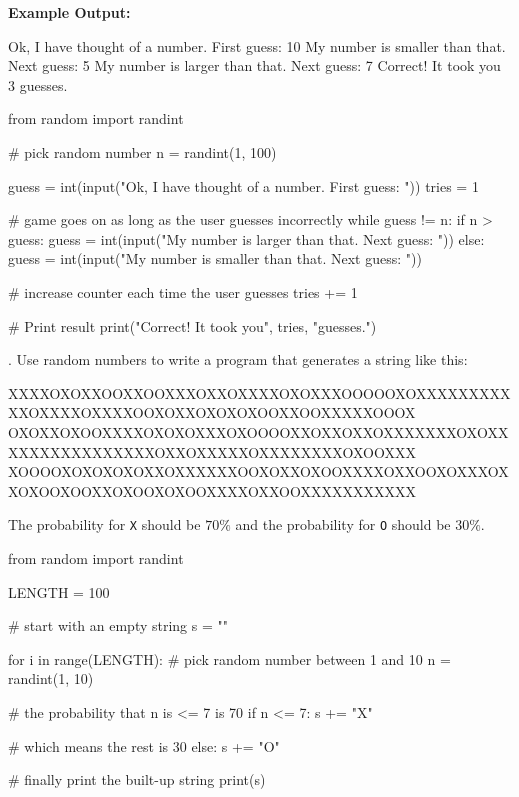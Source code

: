 \vspace{1em}

\noindent \textbf{Example Output:}

\begin{outputcode}
Ok, I have thought of a number. First guess: 10
My number is smaller than that. Next guess: 5
My number is larger than that. Next guess: 7
Correct! It took you 3 guesses.
\end{outputcode}

\begin{solution}
    \begin{pythoncode}
from random import randint

# pick random number
n = randint(1, 100)

guess = int(input("Ok, I have thought of a number. First guess: "))
tries = 1

# game goes on as long as the user guesses incorrectly
while guess != n:
    if n > guess:
        guess = int(input("My number is larger than that. Next guess: "))
    else:
        guess = int(input("My number is smaller than that. Next guess: "))

    # increase counter each time the user guesses
    tries += 1

# Print result
print("Correct! It took you", tries, "guesses.")

    \end{pythoncode}
\end{solution}

. Use random numbers to write a program that generates a string like this:

\begin{outputcode}
XXXXOXOXXOOXXOOXXXOXXOXXXXOXOXXXOOOOOXOXXXXXXXXXXXOXXXXOXXXXOOXOXXOXOXOXOOXXOOXXXXXOOOX
OXOXXOXOOXXXXOXOXOXXXOXOOOOXXOXXOXXOXXXXXXXOXOXXXXXXXXXXXXXXXXOXXOXXXXXOXXXXXXXXOXOOXXX
XOOOOXOXOXOXOXXOXXXXXXOOXOXXOXOOXXXXOXXOOXOXXXOXXOXOOXOOXXOXOOXOXOOXXXXOXXOOXXXXXXXXXXX
\end{outputcode}

\noindent The probability for \texttt{X} should be $70\%$ and the probability for \texttt{O} should be $30\%$.

\begin{solution}
    \begin{pythoncode}
from random import randint

LENGTH = 100

# start with an empty string
s = ""

for i in range(LENGTH):
    # pick random number between 1 and 10
    n = randint(1, 10)

    # the probability that n is <= 7 is 70%
    if n <= 7:
        s += "X"

    # which means the rest is 30%
    else:
        s += "O"

# finally print the built-up string
print(s)
    \end{pythoncode}
\end{solution}


